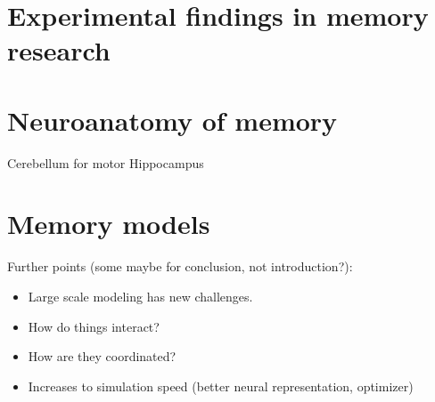 \section{Experimental findings in memory research}

\section{Neuroanatomy of memory}
Cerebellum for motor
Hippocampus

\section{Memory models}

Further points (some maybe for conclusion, not introduction?):
\begin{itemize}
    \item Large scale modeling has new challenges.
    \item How do things interact?
    \item How are they coordinated?
    \item Increases to simulation speed (better neural representation, optimizer)
\end{itemize}

